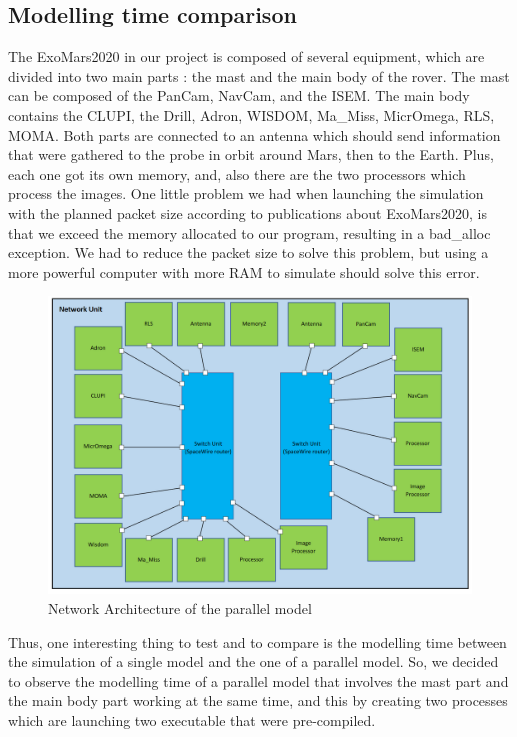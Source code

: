 \documentclass[12pt,a4paper]{article}
\begin{document}
\subsection{Modelling time comparison}

The ExoMars2020 in our project is composed of several equipment, which are divided into two main parts : the mast and the main body of the rover. The mast can be composed of the PanCam, NavCam, and the ISEM. The main body contains the CLUPI, the Drill, Adron, WISDOM, Ma\_Miss, MicrOmega, RLS, MOMA. Both parts are connected to an antenna which should send information that were gathered to the probe in orbit around Mars, then to the Earth. Plus, each one got its own memory, and, also there are the two processors which process the images. One little problem we had when launching the simulation with the planned packet size according to publications about ExoMars2020, is that we exceed the memory allocated to our program, resulting in a bad\_alloc exception. We had to reduce the packet size to solve this problem, but using a more powerful computer with more RAM to simulate should solve this error.

\smallbreak

\begin{figure}[h]
	\centering
    \includegraphics[scale = 0.37]{pictures/split_network.png}
    \caption{Network Architecture of the parallel model}
\end{figure}

Thus, one interesting thing to test and to compare is the modelling time between the simulation of a single model and the one of a parallel model. So, we decided to observe the modelling time of a parallel model that involves the mast part and the main body part working at the same time, and this by creating two processes which are launching two executable that were pre-compiled.
\end{document}
